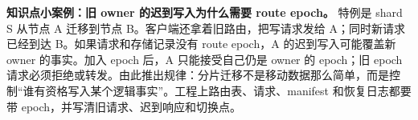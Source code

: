 \begin{casebox}
\textbf{知识点小案例：旧 owner 的迟到写入为什么需要 route epoch。}
特例是 shard S 从节点 A 迁移到节点 B。客户端还拿着旧路由，把写请求发给 A；同时新请求已经到达 B。如果请求和存储记录没有 route epoch，A 的迟到写入可能覆盖新 owner 的事实。加入 epoch 后，A 只能接受自己仍是 owner 的 epoch；旧 epoch 请求必须拒绝或转发。由此推出规律：分片迁移不是移动数据那么简单，而是控制“谁有资格写入某个逻辑事实”。工程上路由表、请求、manifest 和恢复日志都要带 epoch，并写清旧请求、迟到响应和切换点。
\end{casebox}
